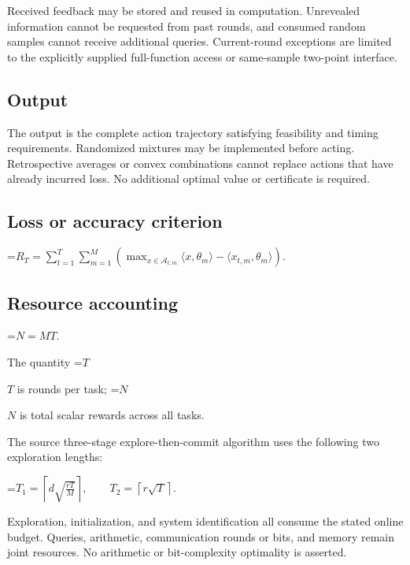 \documentclass[10pt,a4paper]{article}
\newcommand{\AtlasMath}[1]{\par\begingroup\centering\setbox0=\hbox{$\displaystyle #1$}\ifdim\wd0>1.4\linewidth\typeout{ATLAS WIDE FORMULA: \the\wd0}\fi\ifdim\wd0>\linewidth\resizebox{\linewidth}{!}{\box0}\else\box0\fi\par\endgroup}
\newcommand{\AtlasInlineMath}[1]{\begingroup\setbox0=\hbox{$#1$}\ifdim\wd0>.4\linewidth\endgroup\AtlasMath{#1}\else\endgroup$#1$\fi}
\begin{document}
Received feedback may be stored and reused in computation. Unrevealed information cannot be requested from past rounds, and consumed random samples cannot receive additional queries. Current-round exceptions are limited to the explicitly supplied full-function access or same-sample two-point interface.



\subsection{Output}


The output is the complete action trajectory satisfying feasibility and timing requirements. Randomized mixtures may be implemented before acting. Retrospective averages or convex combinations cannot replace actions that have already incurred loss. No additional optimal value or certificate is required.



\subsection{Loss or accuracy criterion}



\AtlasMath{R_T=\sum_{t=1}^{T}\sum_{m=1}^{M}\left(\max_{x\in\mathcal{A}_{t,m}}\langle x,\theta_m\rangle-\langle x_{t,m},\theta_m\rangle\right).}




\subsection{Resource accounting}



\AtlasMath{N=MT.}




The quantity \AtlasInlineMath{T} is rounds per task; \AtlasInlineMath{N} is total scalar rewards across all tasks.



The source three-stage explore-then-commit algorithm uses the following two exploration lengths:




\AtlasMath{T_1=\left\lceil d\sqrt{\frac{rT}{M}}\right\rceil,\qquad T_2=\left\lceil r\sqrt T\right\rceil.}




Exploration, initialization, and system identification all consume the stated online budget. Queries, arithmetic, communication rounds or bits, and memory remain joint resources. No arithmetic or bit-complexity optimality is asserted.
\end{document}
